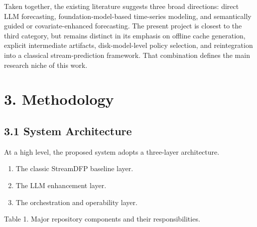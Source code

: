 \documentclass[
  11pt,
  a4paper]{article}
\providecommand{\tightlist}{%
  \setlength{\itemsep}{0pt}\setlength{\parskip}{0pt}}
\begin{document}
Taken together, the existing literature suggests three broad directions:
direct LLM forecasting, foundation-model-based time-series modeling, and
semantically guided or covariate-enhanced forecasting. The present
project is closest to the third category, but remains distinct in its
emphasis on offline cache generation, explicit intermediate artifacts,
disk-model-level policy selection, and reintegration into a classical
stream-prediction framework. That combination defines the main research
niche of this work.

\hypertarget{methodology}{%
\section{3. Methodology}\label{methodology}}

\hypertarget{system-architecture}{%
\subsection{3.1 System Architecture}\label{system-architecture}}

At a high level, the proposed system adopts a three-layer architecture.

\begin{enumerate}
\def\labelenumi{\arabic{enumi}.}
\tightlist
\item
  The classic StreamDFP baseline layer.
\item
  The LLM enhancement layer.
\item
  The orchestration and operability layer.
\end{enumerate}

Table 1. Major repository components and their responsibilities.
\end{document}
